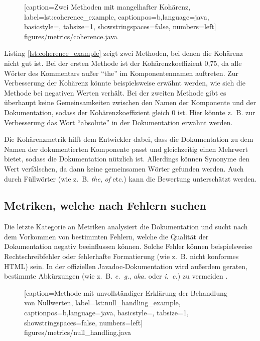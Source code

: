 	\begin{figure}[ht!]
			
			[caption={Zwei Methoden mit mangelhafter Kohärenz},
			label={lst:coherence_example},
			captionpos=b,language=java, basicstyle=\footnotesize, tabsize=1, showstringspaces=false,  numbers=left]
			{figures/metrics/coherence.java}
	\end{figure}
		
 Listing \ref{lst:coherence_example} zeigt zwei Methoden, bei denen die Kohärenz nicht gut ist. Bei der ersten Methode ist der Kohärenzkoeffizient 0,75, da alle Wörter des Kommentars außer \enquote{the} im Komponentennamen auftreten. Zur Verbesserung der Kohärenz könnte beispielsweise erwähnt werden, wie sich die Methode bei negativen Werten verhält. Bei der zweiten Methode gibt es überhaupt keine Gemeinsamkeiten zwischen den Namen der Komponente und der Dokumentation, sodass der Kohärenzkoeffizient gleich 0 ist. Hier könnte z.~B. zur Verbesserung  das Wort \enquote{absolute} in der Dokumentation erwähnt werden.

Die Kohärenzmetrik hilft dem Entwickler dabei, dass die Dokumentation zu dem Namen der dokumentierten Komponente passt und gleichzeitig einen Mehrwert bietet, sodass die Dokumentation nützlich ist. Allerdings können Synonyme den Wert verfälschen, da dann keine gemeinsamen Wörter gefunden werden. Auch durch Füllwörter (wie z.~B. \textit{the}, \textit{of} etc.) kann die Bewertung unterschätzt werden.

\subsection{Metriken, welche  nach Fehlern suchen}\label{chapter:metrics_errors}

Die letzte Kategorie an Metriken analysiert die Dokumentation und sucht nach dem Vorkommen von bestimmten Fehlern, welche die Qualität der Dokumentation negativ beeinflussen können. Solche Fehler können beispielsweise Rechtschreibfehler oder fehlerhafte Formatierung (wie z.~B. nicht konformes \ac{HTML}) sein. In der offiziellen Javadoc-Dokumentation wird außerdem geraten, bestimmte Abkürzungen (wie z.~B. \textit{e.~g.}, \textit{aka.} oder \textit{i.~e.}) zu vermeiden \cite{HowtoWriteDocCommentsfortheJavadocTool}. 

		\begin{figure}[ht!]
			
			[caption={Methode mit unvollständiger Erklärung der Behandlung von Nullwerten},
			label={lst:null_handling_example},
			captionpos=b,language=java, basicstyle=\footnotesize, tabsize=1, showstringspaces=false,  numbers=left]
			{figures/metrics/null_handling.java}
		\end{figure}
		
